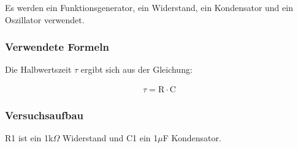 \documentclass[12pt,a4paper]{article}
\begin{document}
Es werden ein Funktionsgenerator, ein Widerstand, ein Kondensator und ein Oszillator verwendet.

\subsubsection{Verwendete Formeln}

Die Halbwertszeit $\tau$ ergibt sich aus der Gleichung:

\begin{align}
\tau = \text{R} \cdot \text{C}
\end{align}

\subsubsection{Versuchsaufbau}

R1 ist ein 1k$\Omega$ Widerstand und C1 ein 1$\mu$F Kondensator.
\end{document}
